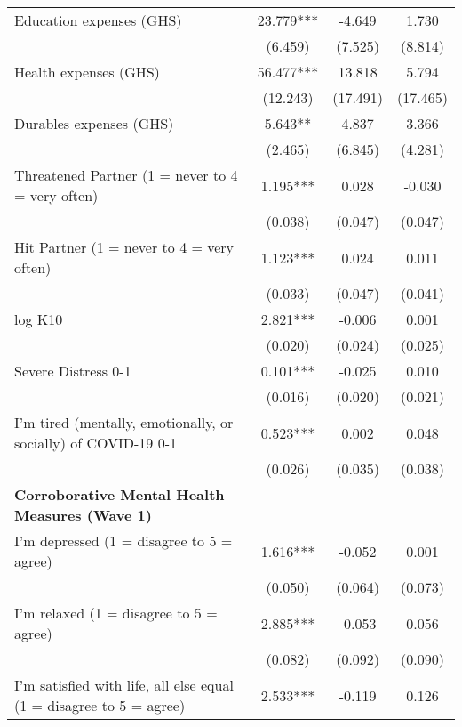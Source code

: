 \begin{ThreePartTable}
\begin{table}[tbp]
\begin{tabular}{lccc}
 Education expenses (GHS) & 23.779*** & -4.649 & 1.730 \\ [0.1em] 
                   &      (6.459)     &      (7.525)     &      (8.814)     \\ [0.1em] 
 Health expenses (GHS) & 56.477*** & 13.818 & 5.794 \\ [0.1em] 
                   &      (12.243)     &      (17.491)     &      (17.465)     \\ [0.1em] 
 Durables expenses (GHS) & 5.643** & 4.837 & 3.366 \\ [0.1em] 
                   &      (2.465)     &      (6.845)     &      (4.281)     \\ [0.1em] 
 Threatened Partner (1 = never to 4 = very often) & 1.195*** & 0.028 & -0.030 \\ [0.1em] 
                   &      (0.038)     &      (0.047)     &      (0.047)     \\ [0.1em] 
 Hit Partner (1 = never to 4 = very often) & 1.123*** & 0.024 & 0.011 \\ [0.1em] 
                   &      (0.033)     &      (0.047)     &      (0.041)     \\ [0.1em] 
 log K10 & 2.821*** & -0.006 & 0.001 \\ [0.1em] 
                   &      (0.020)     &      (0.024)     &      (0.025)     \\ [0.1em] 
 Severe Distress 0-1 & 0.101*** & -0.025 & 0.010 \\ [0.1em] 
                   &      (0.016)     &      (0.020)     &      (0.021)     \\ [0.1em] 
 I'm tired (mentally, emotionally, or socially) of COVID-19 0-1 & 0.523*** & 0.002 & 0.048 \\ [0.1em] 
                   &      (0.026)     &      (0.035)     &      (0.038)     \\ [0.1em] 
\textbf{Corroborative Mental Health Measures (Wave 1)} & & & \\ 
 I'm depressed (1 = disagree to 5 = agree) & 1.616*** & -0.052 & 0.001 \\ [0.1em] 
                   &      (0.050)     &      (0.064)     &      (0.073)     \\ [0.1em] 
 I'm relaxed (1 = disagree to 5 = agree) & 2.885*** & -0.053 & 0.056 \\ [0.1em] 
                   &      (0.082)     &      (0.092)     &      (0.090)     \\ [0.1em] 
 I'm satisfied with life, all else equal (1 = disagree to 5 = agree) & 2.533*** & -0.119 & 0.126 \\ [0.1em] 

\end{tabular}
\end{table}
\end{ThreePartTable}
